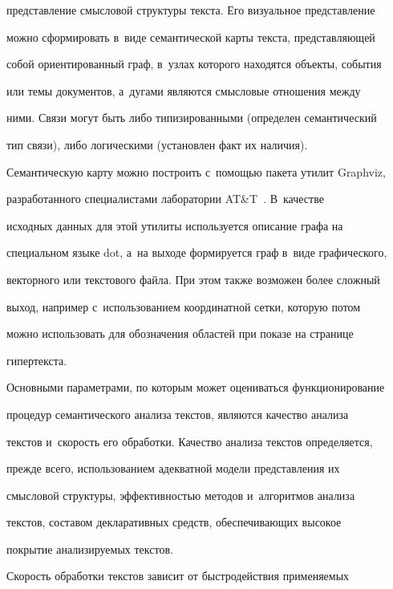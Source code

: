 представление смысловой структуры текста. Его визуальное представление 


можно сформировать в~виде семантической карты текста, представляющей 


собой ориентированный граф, в~узлах которого находятся объекты, события 


или темы документов, а~дугами являются смысловые отношения между 


ними. Связи могут быть либо типизированными (определен семантический 


тип связи), либо логическими (установлен факт их наличия). 


    


Семантическую карту можно построить с~помощью пакета утилит Graphviz, 


разработанного специалистами лаборатории AT\&T~\cite{9-kl}. В~качестве 


исходных данных для этой утилиты используется описание графа на 


специальном языке dot, а~на выходе формируется граф в~виде графического, 


векторного или текстового файла. При этом также возможен более сложный 


выход, например с~использованием координатной сетки, которую потом 


можно использовать для обозначения областей при показе на странице 


гипертекста.


    


Основными параметрами, по которым может оцениваться функционирование 


процедур семантического анализа текстов, являются качество анализа 


текстов и~скорость его обработки. Качество анализа текстов определяется, 


прежде всего, использованием адекватной модели представления их 


смысловой структуры, эффективностью методов и~алгоритмов анализа 


текстов, составом декларативных средств, обеспечивающих высокое 


покрытие анализируемых текстов.





Скорость обработки текстов зависит от быстродействия применяемых 



